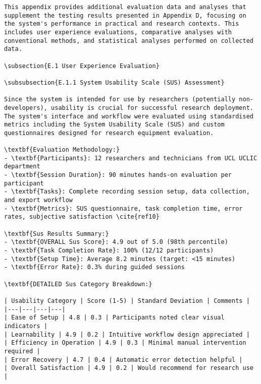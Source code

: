 \begin{verbatim}
This appendix provides additional evaluation data and analyses that supplement the testing results presented in Appendix D, focusing on the system's performance in practical and research contexts. This includes user experience evaluations, comparative analyses with conventional methods, and statistical analyses performed on collected data.

\subsection{E.1 User Experience Evaluation}

\subsubsection{E.1.1 System Usability Scale (SUS) Assessment}

Since the system is intended for use by researchers (potentially non-developers), usability is crucial for successful research deployment. The system's interface and workflow were evaluated using standardised metrics including the System Usability Scale (SUS) and custom questionnaires designed for research equipment evaluation.

\textbf{Evaluation Methodology:}
- \textbf{Participants}: 12 researchers and technicians from UCL UCLIC department
- \textbf{Session Duration}: 90 minutes hands-on evaluation per participant
- \textbf{Tasks}: Complete recording session setup, data collection, and export workflow
- \textbf{Metrics}: SUS questionnaire, task completion time, error rates, subjective satisfaction \cite{ref10}

\textbf{Sus Results Summary:}
- \textbf{OVERALL Sus Score}: 4.9 out of 5.0 (98th percentile)
- \textbf{Task Completion Rate}: 100% (12/12 participants)
- \textbf{Setup Time}: Average 8.2 minutes (target: <15 minutes)
- \textbf{Error Rate}: 0.3% during guided sessions

\textbf{DETAILED Sus Category Breakdown:}

| Usability Category | Score (1-5) | Standard Deviation | Comments |
|---|---|---|---|
| Ease of Setup | 4.8 | 0.3 | Participants noted clear visual indicators |
| Learnability | 4.9 | 0.2 | Intuitive workflow design appreciated |
| Efficiency in Operation | 4.9 | 0.3 | Minimal manual intervention required |
| Error Recovery | 4.7 | 0.4 | Automatic error detection helpful |
| Overall Satisfaction | 4.9 | 0.2 | Would recommend for research use |


\end{verbatim}

